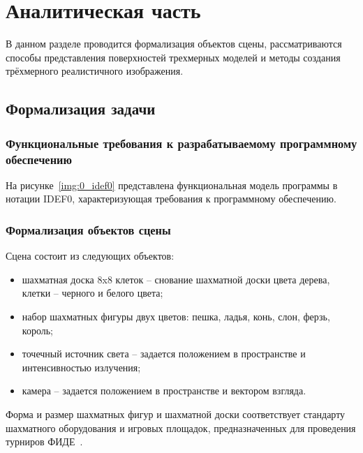 \chapter{Аналитическая часть}


В данном разделе проводится формализация объектов сцены, рассматриваются способы представления поверхностей трехмерных моделей и методы создания трёхмерного реалистичного изображения.

\section{Формализация задачи}

\subsection{Функциональные требования к разрабатываемому программному обеспечению}
На рисунке~\ref{img:0_idef0} представлена функциональная модель программы в нотации IDEF0, характеризующая требования к программному обеспечению.
\FloatBarrier
{}
\FloatBarrier

\subsection{Формализация объектов сцены}
Сцена состоит из следующих объектов:
\begin{itemize}
	\item шахматная доска 8x8 клеток -- снование шахматной доски цвета дерева, клетки -- черного и белого цвета;
	\item набор шахматных фигуры двух цветов: пешка, ладья, конь, слон, ферзь, король;
	\item точечный источник света -- задается положением в пространстве и интенсивностью излучения;
	\item камера -- задается положением в пространстве и вектором взгляда.
\end{itemize}

Форма и размер шахматных фигур и шахматной доски соответствует стандарту шахматного оборудования и игровых площадок, предназначенных для проведения турниров ФИДЕ~\cite{FIDE2015}.

\clearpage

